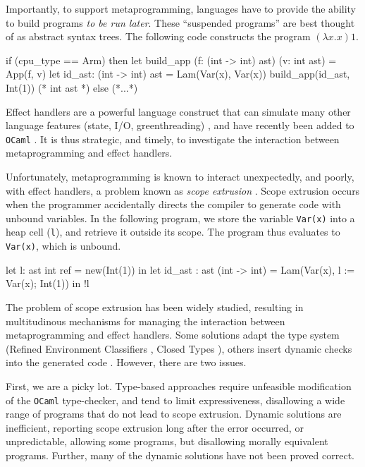 Importantly, to support metaprogramming, languages have to provide the ability to build programs \textit{to be run later}. These ``suspended programs'' are best thought of as abstract syntax trees. The following code constructs the program $(\lambda x. x) 1$.
\begin{ocaml}
if (cpu_type == Arm) then 
  let build_app (f: (int -> int) ast) (v: int ast) = App(f, v)
  let id_ast: (int -> int) ast = Lam(Var(x), Var(x))
  build_app(id_ast, Int(1)) (* int ast *)
else 
  (*...*)
\end{ocaml}

Effect handlers are a powerful language construct that can simulate many other language features (state, I/O, greenthreading) \citep{pretnar-15}, and have recently been added to \texttt{OCaml} \citep{sivaramakrishnan-21}.  It is thus strategic, and timely, to investigate the interaction between metaprogramming and effect handlers. 

Unfortunately, metaprogramming is known to interact unexpectedly, and poorly, with effect handlers, a problem known as \textit{scope extrusion} \citep{kiselyov-14}. Scope extrusion occurs when the programmer accidentally directs the compiler to generate code with unbound variables. In the following program, we store the variable \texttt{Var(x)} into a heap cell (\texttt{l}), and retrieve it outside its scope. The program thus evaluates to \texttt{Var(x)}, which is unbound.

\begin{ocaml}
let l: ast int ref = new(Int(1)) in 
let id_ast : ast (int -> int) = Lam(Var(x), l := Var(x); Int(1)) in
!l
\end{ocaml} 

The problem of scope extrusion has been widely studied, resulting in multitudinous mechanisms for managing the interaction between metaprogramming and effect handlers. Some solutions adapt the type system (Refined Environment Classifiers \citep{kiselyov-16,isoda-24}, Closed Types \citep{calcagno-00}), others insert dynamic checks into the generated code \citep{kiselyov-14}. However, there are two issues.

First, we are a picky lot. Type-based approaches require unfeasible modification of the \texttt{OCaml} type-checker, and tend to limit expressiveness, disallowing a wide range of programs that do not lead to scope extrusion. Dynamic solutions are inefficient, reporting scope extrusion long after the error occurred, or unpredictable, allowing some programs, but disallowing morally equivalent programs. Further, many of the dynamic solutions have not been proved correct.

